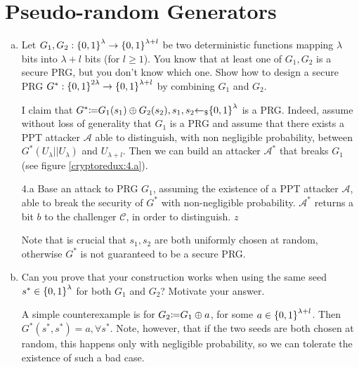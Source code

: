 \section{Pseudo-random Generators}
\begin{enumerate}[(a)]
	\item Let $G_1, G_2: {\{0, 1\}}^\lambda \to {\{0, 1\}}^{\lambda + l}$ be two deterministic functions mapping $\lambda$ bits into $\lambda + l$ bits (for $l \ge 1$). You know that at least one of $G_1, G_2$ is a secure PRG, but you don't know which one. Show how to design a secure PRG $G^*:{\{0, 1\}}^{2\lambda} \to {\{0, 1\}}^{\lambda + l}$ by combining $G_1$ and $G_2$.

	      \begin{solution}
		      I claim that $G^*{\coloneqq} G_1(s_1) \oplus G_2(s_2), s_1, s_2 {\leftarrow_\$} {\{0, 1\}}^\lambda$ is a PRG. Indeed, assume without loss of generality that $G_1$ is a PRG and assume that there exists a PPT attacker $\mathcal{A}$ able to distinguish, with non negligible probability, between $G^*(U_\lambda||U_\lambda)$ and $U_{\lambda + l}$. Then we can build an attacker $\mathcal{A}^*$ that breaks $G_1$ (see figure \ref{cryptoredux:4.a}).
		      \begin{cryptoredux}
			      {4.a}
			      {Base an attack to PRG $G_1$, assuming the existence of a PPT attacker $\mathcal{A}$, able to break the security of $G^*$ with non-negligible probability. $\mathcal{A}^*$ returns a bit $b$ to the challenger $\mathcal{C}$, in order to distinguish.}
			      {}
			      {}
			      {}
			      {$z$}{}
			      \cseqdelay
			      \cseqdelay
		      \end{cryptoredux}

		      Note that is crucial that $s_1, s_2$ are both uniformly chosen at random, otherwise $G^*$ is not guaranteed to be a secure PRG.
	      \end{solution}

	\item Can you prove that your construction works when using the same seed $s^* \in {\{0, 1\}}^\lambda$ for both $G_1$ and $G_2$? Motivate your answer.

	      \begin{solution}
		      A simple counterexample is for $G_2{\coloneqq} G_1 \oplus a$, for some $a \in {\{0, 1\}}^{\lambda + l}$. Then $G^*(s^*, s^*) = a, \forall s^*$. Note, however, that if the two seeds are both chosen at random, this happens only with negligible probability, so we can tolerate the existence of such a bad case.
	      \end{solution}
\end{enumerate}